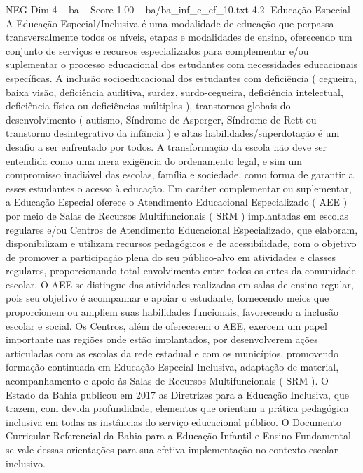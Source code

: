 \begin{textsample}{NEG Dim 4 – ba – Score 1.00 – ba/ba\_inf\_e\_ef\_10.txt}  \label{ex:f4_neg_268}
4.2.
Educação Especial A Educação Especial/Inclusiva é uma modalidade de educação que perpassa transversalmente todos os níveis, etapas e modalidades de ensino, oferecendo um conjunto de serviços e recursos especializados para complementar e/ou suplementar o processo educacional dos estudantes com necessidades educacionais específicas.
A inclusão socioeducacional dos estudantes com deficiência ( cegueira, baixa visão, deficiência auditiva, surdez, surdo-cegueira, deficiência intelectual, deficiência física ou deficiências múltiplas ), transtornos globais do desenvolvimento ( autismo, Síndrome de Asperger, Síndrome de Rett ou transtorno desintegrativo da infância ) e altas habilidades/superdotação é um desafio a ser enfrentado por todos.
A transformação da escola não deve ser entendida como uma mera exigência do ordenamento legal, e sim um compromisso inadiável das escolas, família e sociedade, como forma de garantir a esses estudantes o acesso à educação.
Em caráter complementar ou suplementar, a Educação Especial oferece o Atendimento Educacional Especializado ( AEE ) por meio de Salas de Recursos Multifuncionais ( SRM ) implantadas em escolas regulares e/ou Centros de Atendimento Educacional Especializado, que elaboram, disponibilizam e utilizam recursos pedagógicos e de acessibilidade, com o objetivo de promover a participação plena do seu público-alvo em atividades e classes regulares, proporcionando total envolvimento entre todos os entes da comunidade escolar.
O AEE se distingue das atividades realizadas em salas de ensino regular, pois seu objetivo é acompanhar e apoiar o estudante, fornecendo meios que proporcionem ou ampliem suas habilidades funcionais, favorecendo a inclusão escolar e social.
Os Centros, além de oferecerem o AEE, exercem um papel importante nas regiões onde estão implantados, por desenvolverem ações articuladas com as escolas da rede estadual e com os municípios, promovendo formação continuada em Educação Especial Inclusiva, adaptação de material, acompanhamento e apoio às Salas de Recursos Multifuncionais ( SRM ).
O Estado da Bahia publicou em 2017 as Diretrizes para a Educação Inclusiva, que trazem, com devida profundidade, elementos que orientam a prática pedagógica inclusiva em todas as instâncias do serviço educacional público.
O Documento Curricular Referencial da Bahia para a Educação Infantil e Ensino Fundamental se vale dessas orientações para sua efetiva implementação no contexto escolar inclusivo.

\end{textsample}
